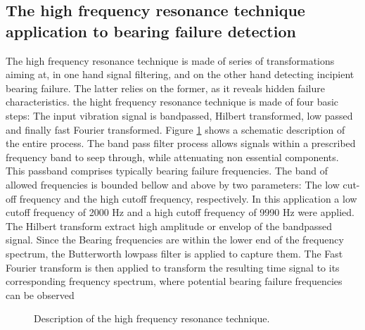 \documentclass[../Main/thesis.tex]{subfiles}
\begin{document}
\subsection{The high frequency resonance technique application to bearing failure detection}
\label{sec:method}
The high frequency resonance technique is made of series of transformations aiming at, in one hand signal filtering, and on the other hand detecting incipient bearing failure. The latter relies on the former, as it reveals hidden failure characteristics.
the hight frequency resonance technique is made of four basic steps: The input vibration signal is bandpassed, Hilbert transformed, low passed and finally fast Fourier transformed. 
Figure \ref{fig:fft-process} shows a schematic description of the entire process. 
\justify
The band pass filter process allows signals within a prescribed frequency band to seep through, while attenuating non essential components. This passband comprises typically bearing failure frequencies. The band of allowed frequencies is bounded bellow and above by two parameters: The low cut-off frequency and the high cutoff frequency, respectively. In this application a low cutoff frequency of 2000 Hz and a high cutoff frequency of 9990 Hz were applied.
The Hilbert transform extract high amplitude or envelop of the bandpassed signal. Since the Bearing frequencies are within the lower end of the frequency spectrum, the Butterworth lowpass filter is applied to capture them. The Fast Fourier transform is then applied to transform the resulting time signal to its corresponding frequency spectrum, where potential bearing failure frequencies can be observed
\begin{figure}[H]
  \caption{Description of the high frequency resonance technique.}
   \label{fig:fft-process}
\end{figure}
\end{document}
